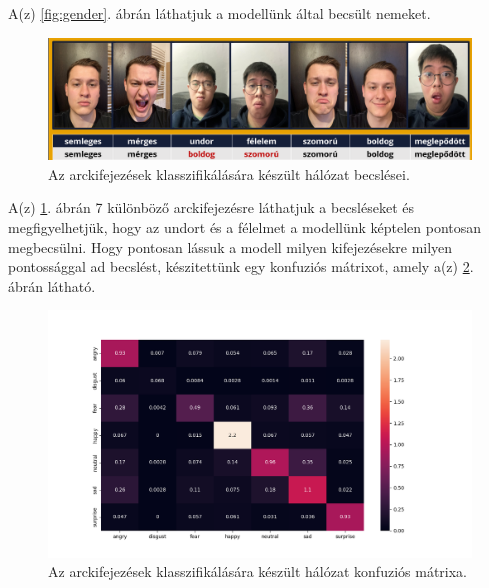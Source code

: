\documentclass[12pt,a4]{article}
\begin{document}
                A(z) \ref{fig:gender}. ábrán láthatjuk a modellünk által becsült nemeket.
            
                \newpage
                \begin{figure}[h!]	
            		\centering
            		\includegraphics[width=1\linewidth]{arcanalizis}
                    \caption{  Az arckifejezések klasszifikálására készült hálózat becslései.}
                    \label{fig:expr}
            	\end{figure}
            
                A(z) \ref{fig:expr}. ábrán 7 különböző arckifejezésre láthatjuk a becsléseket és megfigyelhetjük, hogy az undort és a félelmet a modellünk képtelen pontosan megbecsülni. Hogy pontosan lássuk a modell milyen kifejezésekre milyen pontossággal ad becslést, készitettünk egy konfuziós mátrixot, amely a(z) \ref{fig:cfmatrix}. ábrán látható.
            
                \begin{figure}[h!]	
            		\centering
            		\includegraphics[width=1\linewidth]{output_cf_matrix.png}
                    \caption{Az arckifejezések klasszifikálására készült hálózat konfuziós mátrixa.}
                    \label{fig:cfmatrix}
            	\end{figure}

            \newpage
        
\end{document}
